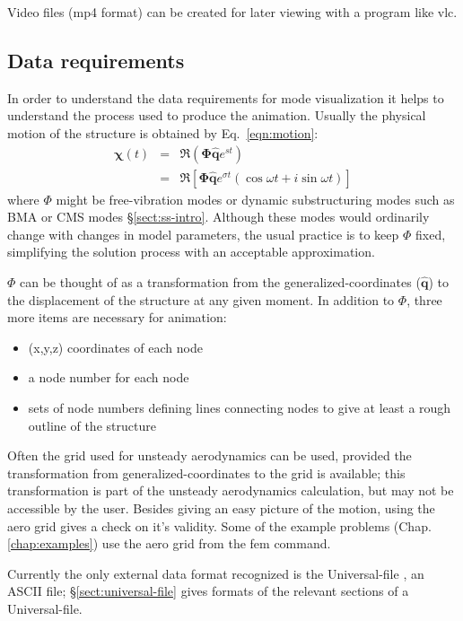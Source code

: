 \documentclass[11pt,openany,twoside]{book}
\numberwithin{equation}{section}		%
\newcommand{\Cmd}[1]{{\sf #1}}
\newcommand{\Matrix}[1]{\boldsymbol{#1}}
\newcommand{\Vector}[1]{\boldsymbol{#1}}
\newcommand{\Sectref}[1]{\S\ref{#1}}
\newcommand{\Chapref}[1]{Chap. \ref{#1}}
\newcommand{\Eqn}[1]{Eq.\ \ref{#1}}  %
\begin{document}
Video files (mp4 format) can be created for later viewing with a
program like \Cmd{vlc}.

\subsection{Data requirements}\label{sect:amdata}
In order to understand the data requirements for mode visualization
it helps to understand the process used to produce the animation.
Usually the physical motion of the structure is obtained by \Eqn{eqn:motion}:
\begin{eqnarray} %
\Vector{\chi}(t) & = & \Re \left(\Matrix{\Phi}\hat{\Vector{q}}e^{st}\right) \nonumber \\
              & = & \Re \left[\Matrix{\Phi}\hat{\Vector{q}} e^{\sigma t}
				  			\left(\cos \omega t + i \sin \omega t \right) \right] \nonumber
\end{eqnarray}
where $\Phi$ might be free-vibration modes or dynamic substructuring modes
such as BMA or CMS modes \Sectref{sect:ss-intro}.
\index{=Phi@$\Matrix{\Phi}$!animated modes}
Although these modes would ordinarily change with changes in model parameters,
the usual practice is to keep $\Phi$ fixed, simplifying the solution process
with an acceptable approximation.

$\Phi$ can be thought of as a transformation from the generalized-coordinates
($\hat{\Vector{q}}$) to the displacement of the structure at any given
moment. In addition to $\Phi$, three more items are necessary for animation:
\begin{itemize}
	\item (x,y,z) coordinates of each node
	\item a node number for each node
	\item sets of node numbers defining lines connecting nodes to give
		at least a rough outline of the structure
\end{itemize}

Often the grid used for unsteady aerodynamics can be used, provided
the transformation from generalized-coordinates to the grid is available;
this transformation is part of the unsteady aerodynamics calculation,
but may not be accessible by the user. Besides giving an easy picture
of the motion, using the aero grid gives a check on it's validity.
Some of the example problems (\Chapref{chap:examples})
use the aero grid from the \Cmd{fem} command.

Currently the only external data format recognized is the Universal-file
\cite{UniversalFile}, an ASCII file; \Sectref{sect:universal-file} gives
formats of the relevant sections of a Universal-file.
\end{document}
